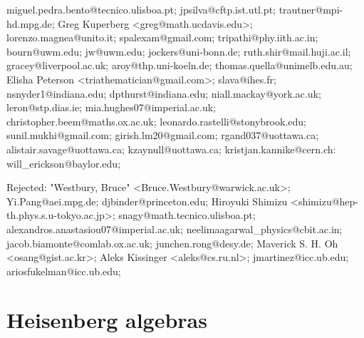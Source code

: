 \begin{description}
miguel.pedra.bento@tecnico.ulisboa.pt;
jpsilva@cftp.ist.utl.pt; trautner@mpi-hd.mpg.de;
Greg Kuperberg <greg@math.ucdavis.edu>;
lorenzo.magnea@unito.it;
spalexam@gmail.com; tripathi@phy.iith.ac.in;
bourn@uwm.edu; jw@uwm.edu;
jockers@uni-bonn.de;
ruth.shir@mail.huji.ac.il;
gracey@liverpool.ac.uk;
aroy@thp.uni-koeln.de; thomas.quella@unimelb.edu.au;
Elisha Peterson <triathematician@gmail.com>;
slava@ihes.fr;
nsnyder1@indiana.edu; dpthurst@indiana.edu;
niall.mackay@york.ac.uk;
leron@stp.dias.ie;
mia.hughes07@imperial.ac.uk;
christopher.beem@maths.ox.ac.uk; leonardo.rastelli@stonybrook.edu;
sunil.mukhi@gmail.com; girish.lm20@gmail.com;
rgand037@uottawa.ca; alistair.savage@uottawa.ca; kzaynull@uottawa.ca;
kristjan.kannike@cern.ch:  %
will\_erickson@baylor.edu;

Rejected:
"Westbury, Bruce" <Bruce.Westbury@warwick.ac.uk>;
Yi.Pang@aei.mpg.de;
djbinder@princeton.edu;
Hiroyuki Shimizu <shimizu@hep-th.phys.s.u-tokyo.ac.jp>;
snagy@math.tecnico.ulisboa.pt;
alexandros.anastasiou07@imperial.ac.uk;
neelimaagarwal\_physics@cbit.ac.in; %
jacob.biamonte@comlab.ox.ac.uk;
junchen.rong@desy.de;
Maverick S. H. Oh <osang@gist.ac.kr>;
Aleks Kissinger <aleks@cs.ru.nl>;
jmartinez@icc.ub.edu; ariosfukelman@icc.ub.edu;





\end{description}

\section{Heisenberg algebras}
\label{s-Heisenberg}

